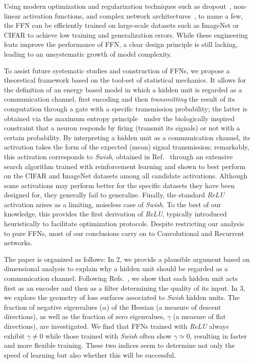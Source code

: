 \documentclass{article}
\begin{document}
Using modern optimization and regularization techniques such as dropout~\cite{srivastava2014}, non-linear activation functions, and complex network architectures~\cite{Krizhevsky}, to name a few, the FFN can be efficiently trained on large-scale datasets such as ImageNet or CIFAR to achieve low training and generalization errors.
While these engineering feats improve the performance of FFN, a clear design principle is still lacking, leading to an unsystematic growth of model complexity.

To assist future systematic studies and construction of FFNs, we propose a theoretical framework based on the tool-set of statistical mechanics. It allows for the definition of an energy based model in which a hidden unit is regarded as a communication channel, first encoding and then {\it transmitting} the result of its computation through a gate with a specific transmission probability;  the latter is obtained via the maximum entropy principle~\cite{zecchina, jaynes} under the biologically inspired constraint that a neuron responds by firing (transmit its signals) or not with a certain probability.
By interpreting a hidden unit as a communication channel, its activation takes the form of the expected (mean) signal transmission; remarkably, this activation corresponds to {\it Swish}, obtained in Ref.~\cite{elfwig, prajit} through an extensive search algorithm trained with reinforcement learning and shown to best perform on the CIFAR and ImageNet datasets among all candidate activations. Although some activations may perform better for the specific datasets they have been designed for, they generally fail to generalize. Finally, the standard {\it ReLU} activation arises as a limiting, noiseless case of {\it Swish}. To the best of our knowledge, this provides the first  derivation of  {\it ReLU}, typically introduced heuristically to facilitate optimization protocols. Despite restricting our analysis to pure FFNs, most of our conclusions carry on to Convolutional and Recurrent networks.

The paper is organized as follows: In 2, we provide a plausible argument based on dimensional analysis to explain why a hidden unit should be regarded as a communication channel. Following Refs.~\cite{tishby1, tishby2}, we show that each hidden unit acts first as an encoder and then as a filter determining the quality of its input. In 3, we explore the geometry of loss surfaces associated to {\it Swish} hidden units. The fraction of negative eigenvalues ($\alpha$) of the Hessian (a measure of descent directions), as well as the fraction of zero eigenvalues, $\gamma$ (a measure of flat directions), are investigated. We find that FFNs trained with {\it ReLU} always exhibit $\gamma \neq 0$  while those trained with {\it Swish} often show $\gamma \simeq 0$, resulting in faster and more flexible training. These two indices seem to determine not only the speed of learning but also whether this will be successful.
%
\end{document}
